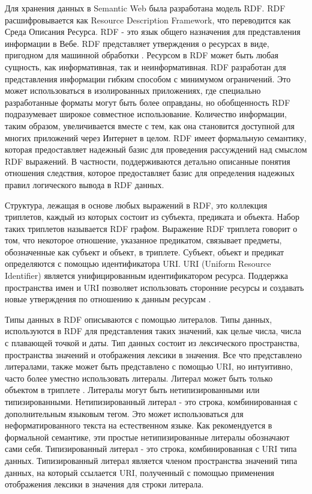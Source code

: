 Для хранения данных в Semantic Web была разработана модель RDF. RDF расшифровывается как Resource Description Framework, что переводится как Среда Описания Ресурса. RDF - это язык общего назначения для представления информации в Вебе. RDF представляет утверждения о ресурсах в виде, пригодном для машинной обработки \cite{aghaei2012evolution}. Ресурсом в RDF может быть любая сущность, как информативная, так и неинформативная. RDF разработан для представления информации гибким способом с минимумом ограничений. Это может использоваться в изолированных приложениях, где специально разработанные форматы могут быть более оправданы, но обобщенность RDF подразумевает широкое совместное использование. Количество информации, таким образом, увеличивается вместе с тем, как она становится доступной для многих приложений через Интернет в целом. RDF имеет формальную семантику, которая предоставляет надежный базис для проведения рассуждений	над смыслом RDF выражений. В частности, поддерживаются детально описанные понятия отношения следствия, которое предоставляет базис для определения надежных правил логического вывода в RDF данных.

Структура, лежащая в основе любых выражений в RDF, это коллекция триплетов, каждый из которых состоит из субъекта, предиката и объекта. Набор таких триплетов называется RDF графом. Выражение RDF триплета говорит о том, что некоторое отношение, указанное предикатом, связывает предметы, обозначенные как субъект и объект, в триплете. Субъект, объект и предикат определяются с помощью идентификатора URI. URI (Uniform Resource Identifier) является унифицированным идентификатором ресурса. Поддержка пространства имен и URI позволяет использовать сторонние ресурсы и создавать новые утверждения по отношению к данным ресурсам \cite{klyne2006resource}.

Типы данных в RDF описываются с помощью литералов. Типы данных, используются в RDF для представления таких значений, как целые числа, числа с плавающей точкой и даты. Тип данных состоит из лексического пространства, пространства значений и отображения лексики в значения. Все что представлено литералами, также может быть представлено с помощью URI, но интуитивно, часто более уместно использовать литералы. Литерал может быть только объектом в триплете \cite{lassila2002taking}. Литералы могут быть нетипизированными или типизированными. Нетипизированный литерал - это строка, комбинированная с дополнительным языковым тегом. Это может использоваться для неформатированного текста на естественном языке. Как рекомендуется в формальной семантике, эти простые нетипизированные литералы обозначают сами себя. Типизированный литерал - это строка, комбинированная с URI типа данных. Типизированный литерал является членом пространства значений типа данных, на который ссылается URI, полученный с помощью применения отображения лексики в значения для строки литерала.

